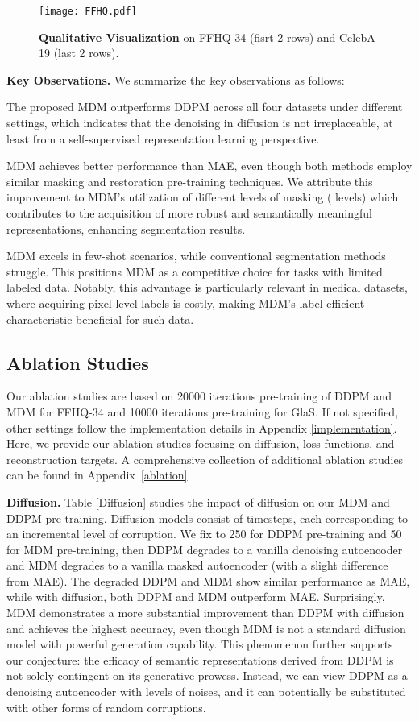\documentclass{article} \usepackage{iclr2024_conference,times}
\begin{document}
\begin{figure}[!htp]
\centering
\texttt{[image: FFHQ.pdf]} \caption{\textbf{Qualitative Visualization} on FFHQ-34 (fisrt 2 rows) and CelebA-19 (last 2 rows).}
\label{FFHQ_seg}
\end{figure}


\textbf{Key Observations.} We summarize the key observations as follows:

 The proposed MDM outperforms DDPM across all four datasets under different settings, which indicates that the denoising in diffusion is not irreplaceable, at least from a self-supervised representation learning perspective.

 MDM achieves better performance than MAE, even though both methods employ similar masking and restoration pre-training techniques. We attribute this improvement to MDM's utilization of different levels of masking ( levels) which contributes to the acquisition of more robust and semantically meaningful representations, enhancing segmentation results.

 MDM excels in few-shot scenarios, while conventional segmentation methods struggle. This positions MDM as a competitive choice for tasks with limited labeled data. Notably, this advantage is particularly relevant in medical datasets, where acquiring pixel-level labels is costly, making MDM's label-efficient characteristic beneficial for such data.


\subsection{Ablation Studies}
Our ablation studies are based on 20000 iterations pre-training of DDPM and MDM for FFHQ-34 and 10000 iterations pre-training for GlaS. If not specified, other settings follow the implementation details in Appendix \ref{implementation}. Here, we provide our ablation studies focusing on diffusion, loss functions, and reconstruction targets. A comprehensive collection of additional ablation studies can be found in Appendix~\ref{ablation}.

\textbf{Diffusion.} Table \ref{Diffusion} studies the impact of diffusion on our MDM and DDPM pre-training. Diffusion models consist of  timesteps, each corresponding to an incremental level of corruption. We fix  to 250 for DDPM pre-training and 50 for MDM pre-training, then DDPM degrades to a vanilla denoising autoencoder and MDM degrades to a vanilla masked autoencoder (with a slight difference from MAE). The degraded DDPM and MDM show similar performance as MAE, while with diffusion, both DDPM and MDM outperform MAE. Surprisingly, MDM demonstrates a more substantial improvement than DDPM with diffusion and achieves the highest accuracy, even though MDM is not a standard diffusion model with powerful generation capability. This phenomenon further supports our conjecture: 
the efficacy of semantic representations derived from DDPM is not solely contingent on its generative prowess. Instead, we can view DDPM as a denoising autoencoder with  levels of noises, and it can potentially be substituted with other forms of random corruptions.
\end{document}

